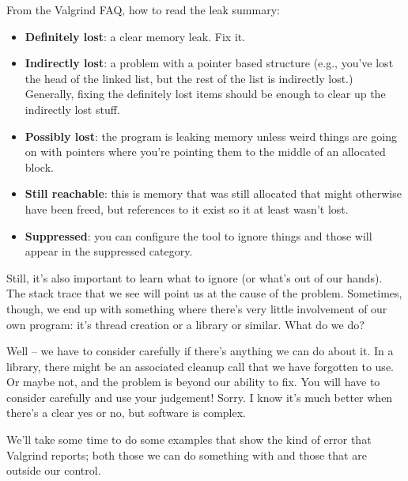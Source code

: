 \documentclass[a4paper]{report}
\begin{document}
From the Valgrind FAQ, how to read the leak summary:
\begin{itemize}
	\item \textbf{Definitely lost}: a clear memory leak. Fix it.
	\item \textbf{Indirectly lost}: a problem with a pointer based structure (e.g., you've lost the head of the linked list, but the rest of the list is indirectly lost.) Generally, fixing the definitely lost items should be enough to clear up the indirectly lost stuff.
	\item \textbf{Possibly lost}: the program is leaking memory unless weird things are going on with pointers where you're pointing them to the middle of an allocated block.
	\item \textbf{Still reachable}: this is memory that was still allocated that might otherwise have been freed, but references to it exist so it at least wasn't lost.
	\item \textbf{Suppressed}: you can configure the tool to ignore things and those will appear in the suppressed category.
\end{itemize}

Still, it's also important to learn what to ignore (or what's out of our hands). The stack trace that we see will point us at the cause of the problem. Sometimes, though, we end up with something where there's very little involvement of our own program: it's thread creation or a library or similar. What do we do?

Well -- we have to consider carefully if there's anything we can do about it. In a library, there might be an associated cleanup call that we have forgotten to use. Or maybe not, and the problem is beyond our ability to fix. You will have to consider carefully and use your judgement! Sorry. I know it's much better when there's a clear yes or no, but software is complex.

We'll take some time to do some examples that show the kind of error that Valgrind reports; both those we can do something with and those that are outside our control.
\end{document}
